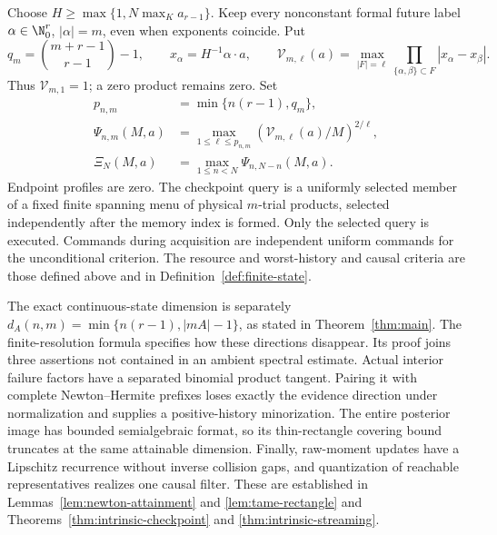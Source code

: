 Choose $H\ge\max\{1,N\max_K a_{r-1}\}$. Keep every nonconstant
formal future label $\alpha\in\N_0^r$, $|\alpha|=m$, even when
exponents coincide. Put
\[
 q_m=\binom{m+r-1}{r-1}-1,\qquad x_\alpha=H^{-1}\alpha\cdot a,
 \qquad
 \mathcal V_{m,\ell}(a)=\max_{|F|=\ell}
       \prod_{\{\alpha,\beta\}\subset F}|x_\alpha-x_\beta|.
\]
Thus $\mathcal V_{m,1}=1$; a zero product remains zero. Set
\[
 \begin{split}
 p_{n,m}&=\min\{n(r-1),q_m\},\\
 \Psi_{n,m}(M,a)&=\max_{1\le\ell\le p_{n,m}}
       (\mathcal V_{m,\ell}(a)/M)^{2/\ell},\\
 \Xi_N(M,a)&=\max_{1\le n<N}\Psi_{n,N-n}(M,a).
 \end{split}
\]
Endpoint profiles are zero. The checkpoint query is a uniformly selected
member of a fixed finite spanning menu of physical $m$-trial products,
selected independently after the memory index is formed. Only the
selected query is executed. Commands during acquisition are independent
uniform commands for the unconditional criterion. The resource and
worst-history and causal criteria are those defined above and in
Definition~\ref{def:finite-state}.



The exact continuous-state dimension is separately
$d_A(n,m)=\min\{n(r-1),|mA|-1\}$, as stated in
Theorem~\ref{thm:main}. The finite-resolution formula specifies how
these directions disappear. Its proof joins three assertions not
contained in an ambient spectral estimate. Actual interior failure
factors have a separated binomial product tangent. Pairing it with
complete Newton--Hermite prefixes loses exactly the evidence direction
under normalization and supplies a positive-history minorization.
The entire posterior image has bounded semialgebraic format, so its
thin-rectangle covering bound truncates at the same attainable
dimension. Finally, raw-moment updates have a Lipschitz recurrence
without inverse collision gaps, and quantization of reachable
representatives realizes one causal filter. These are established in
Lemmas~\ref{lem:newton-attainment} and \ref{lem:tame-rectangle} and
Theorems~\ref{thm:intrinsic-checkpoint} and
\ref{thm:intrinsic-streaming}.

